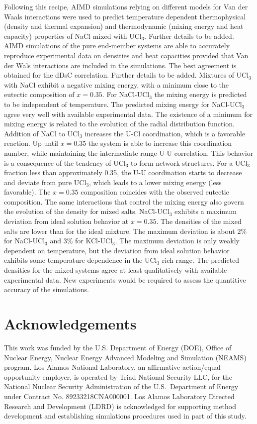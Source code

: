 \documentclass[preprint,3p,10pt,twocolumn,number,sort&compress]{elsarticle}
\begin{document}
Following this recipe, AIMD simulations relying on different models for Van der Waals interactions were used to predict temperature dependent thermophysical (density and thermal expansion) and thermodynamic (mixing energy and heat capacity) properties of NaCl mixed with UCl$_3$. {\color{red} Further details to be added.}
AIMD simulations of the pure end-member systems are able to accurately reproduce experimental data on densities and heat capacities provided that Van der Wals interactions are included in the simulations. The best agreement is obtained for the dDsC correlation. {\color{red} Further details to be added.} Mixtures of UCl$_3$ with NaCl exhibit a negative mixing energy, with a minimum close to the eutectic composition of $x=0.35$. For NaCl-UCl$_3$ the mixing energy is predicted to be independent of temperature. The predicted mixing energy for NaCl-UCl$_3$ agree very well with available experimental data. 
The existence of a minimum for mixing energy is related to the evolution of the radial distribution function. Addition of NaCl to UCl$_3$ increases the U-Cl coordination, which is a favorable reaction. Up until $x=0.35$ the system is able to increase this coordination number, while maintaining the intermediate range U-U correlation. This behavior is a consequence of the tendency of UCl$_3$ to form network structures. For a UCl$_3$ fraction less than approximately 0.35, the U-U coordination starts to decrease and deviate from pure UCl$_3$, which leads to a lower mixing energy (less favorable). The $x=0.35$ composition coincides with the observed eutectic composition. 
The same interactions that control the mixing energy also govern the evolution of the density for mixed salts. NaCl-UCl$_3$ exhibits a maximum deviation from ideal solution behavior at $x=0.35$. The densities of the mixed salts are lower than for the ideal mixture. The maximum deviation is about 2\% for NaCl-UCl$_3$ and 3\% for KCl-UCl$_3$. The maximum deviation is only weakly dependent on temperature, but the deviation from ideal solution behavior exhibits some temperature dependence in the UCl$_3$ rich range. The predicted densities for the mixed systems agree at least qualitatively with available experimental data. New experiments would be required to assess the quantitive accuracy of the simulations. 

\section*{Acknowledgements}
This work was funded by the U.S. Department of Energy (DOE), Office of Nuclear Energy, Nuclear Energy Advanced Modeling and Simulation (NEAMS) program. Los Alamos National Laboratory, an affirmative action/equal opportunity employer, is operated by Triad National Security LLC, for the National Nuclear Security Administration of the U.S.\ Department of Energy under Contract No. 89233218CNA000001. Los Alamos Laboratory Directed Research and Development (LDRD) is acknowledged for supporting method development and establishing simulations procedures used in part of this study.

         

\end{document}
